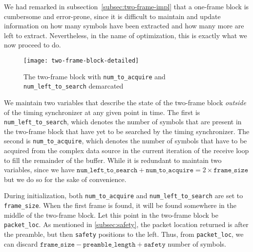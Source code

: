 We had remarked in subsection~\ref{subsec:two-frame-impl} that a one-frame
block is cumbersome and error-prone, since it is difficult to maintain and
update information on how many symbols have been extracted and how many more
are left to extract. Nevertheless, in the name of optimization, this is
exactly what we now proceed to do.

\begin{figure}[h]
	\centering
	\texttt{[image: two-frame-block-detailed]}
	\caption{The two-frame block with \texttt{num\_to\_acquire} and
	         \texttt{num\_left\_to\_search} demarcated}
	\label{fig:two-frame-block-detailed}
\end{figure}

\begin{sloppypar}
We maintain two variables that describe the state of the two-frame block
\emph{outside} of the timing synchronizer at any given point in time. The first
is \texttt{num\_left\_to\_search}, which denotes the number of symbols that
are present in the two-frame block that have yet to be searched by the timing
synchronizer. The second is \verb+num_to_acquire+, which denotes the number of
symbols that have to be acquired from the complex data source in the current
iteration of the receive loop to fill the remainder of the buffer. While it is
redundant to maintain two variables, since we have
$\texttt{num\_left\_to\_search} + \texttt{num\_to\_acquire} = 2 \times
\texttt{frame\_size}$ but we do so for the sake of convenience.
\end{sloppypar}

During initialization, both \verb+num_to_acquire+ and \verb+num_left_to_search+
are set to \verb+frame_size+. When the first frame is found, it will be found
somewhere in the middle of the two-frame block. Let this point in the two-frame
block be \verb+packet_loc+. As mentioned in \ref{subsec:safety}, the packet
location returned is after the preamble, but then \verb+safety+ positions to
the left. Thus, from \verb+packet_loc+, we can discard $\texttt{frame\_size}
- \texttt{preamble\_length} + \texttt{safety}$ number of symbols.

